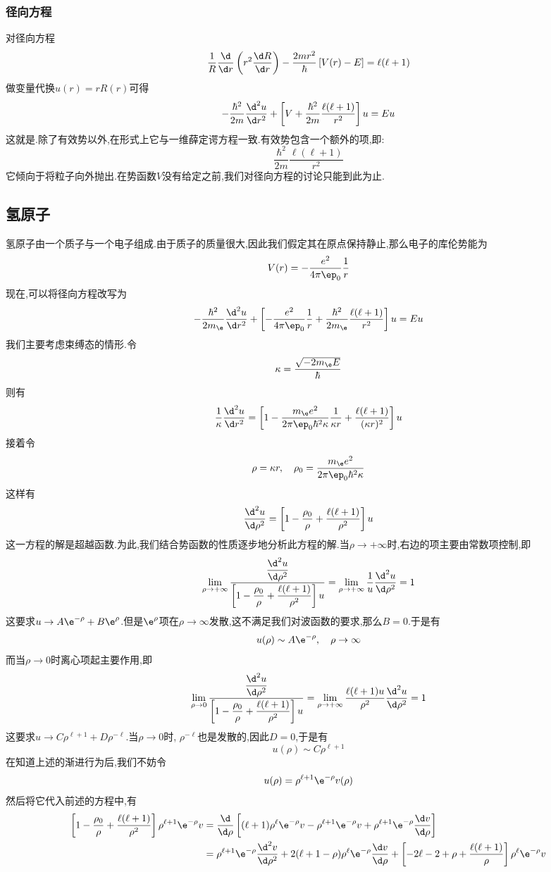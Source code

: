 \documentclass{ctexart}
\begin{document}
\subsubsection{径向方程}
对径向方程
\[\dfrac{1}{R}\dfrac{\d}{\d r}\left(r^2\dfrac{\d R}{\d r}\right)-\dfrac{2mr^2}{\hbar}\left[V(r)-E\right]=\ell(\ell+1)\]
做变量代换$u(r)=rR(r)$可得
\[-\dfrac{\hbar^2}{2m}\dfrac{\d^2 u}{\d r^2}+\left[V+\dfrac{\hbar^2}{2m}\dfrac{\ell(\ell+1)}{r^2}\right]u=Eu\]
这就是.除了有效势以外,在形式上它与一维薛定谔方程一致.有效势包含一个额外的项,即:
\[\dfrac{\hbar^2}{2m}\dfrac{\ell(\ell+1)}{r^2}\]
它倾向于将粒子向外抛出.在势函数$V$没有给定之前,我们对径向方程的讨论只能到此为止.
\subsection{氢原子}
氢原子由一个质子与一个电子组成.由于质子的质量很大,因此我们假定其在原点保持静止,那么电子的库伦势能为
\[V(r)=-\dfrac{e^2}{4\pi\ep_0}\dfrac{1}{r}\]
现在,可以将径向方程改写为
\[-\dfrac{\hbar^2}{2m_\e}\dfrac{\d^2u}{\d r^2}+\left[-\dfrac{e^2}{4\pi\ep_0}\dfrac1r+\dfrac{\hbar^2}{2m_\e}\dfrac{\ell(\ell+1)}{r^2}\right]u=Eu\]
\indent 我们主要考虑束缚态的情形.令
\[\kappa=\dfrac{\sqrt{-2m_\e E}}{\hbar}\]
则有
\[\dfrac{1}{\kappa}\dfrac{\d^2u}{\d r^2}=\left[1-\dfrac{m_\e e^2}{2\pi\ep_0\hbar^2\kappa}\dfrac{1}{\kappa r}+\dfrac{\ell(\ell+1)}{(\kappa r)^2}\right]u\]
接着令
\[\rho=\kappa r,\quad\rho_0=\dfrac{m_\e e^2}{2\pi\ep_0\hbar^2\kappa}\]
这样有
\[\dfrac{\d^2u}{\d\rho^2}=\left[1-\dfrac{\rho_0}{\rho}+\dfrac{\ell(\ell+1)}{\rho^2}\right]u\]
\indent 这一方程的解是超越函数.为此,我们结合势函数的性质逐步地分析此方程的解.当$\rho\to+\infty$时,右边的项主要由常数项控制,即
\[\lim_{\rho\to+\infty}\dfrac{\dfrac{\d^2u}{\d\rho^2}}{\left[1-\dfrac{\rho_0}{\rho}+\dfrac{\ell(\ell+1)}{\rho^2}\right]u}=\lim_{\rho\to+\infty}\dfrac{1}{u}\dfrac{\d^2u}{\d\rho^2}=1\]
这要求$u\to A\e^{-\rho}+B\e^{\rho}$.但是$\e^{\rho}$项在$\rho\to\infty$发散,这不满足我们对波函数的要求,那么$B=0$.于是有
\[u(\rho)\sim A\e^{-\rho},\quad\rho\to\infty\]
而当$\rho\to0$时离心项起主要作用,即
\[\lim_{\rho\to0}\dfrac{\dfrac{\d^2u}{\d\rho^2}}{\left[1-\dfrac{\rho_0}{\rho}+\dfrac{\ell(\ell+1)}{\rho^2}\right]u}=\lim_{\rho\to+\infty}\dfrac{\ell(\ell+1)u}{\rho^2}\dfrac{\d^2 u}{\d\rho^2}=1\]
这要求$u\to C\rho^{\ell+1}+D\rho^{-\ell}$.当$\rho\to0$时, $\rho^{-\ell}$也是发散的,因此$D=0$,于是有
\[u(\rho)\sim C\rho^{\ell+1}\]
\indent 在知道上述的渐进行为后,我们不妨令
\[u(\rho)=\rho^{\ell+1}\e^{-\rho}v(\rho)\]
然后将它代入前述的方程中,有
\[\begin{aligned}
    \left[1-\dfrac{\rho_0}{\rho}+\dfrac{\ell(\ell+1)}{\rho^2}\right]\rho^{\ell+1}\e^{-\rho}v
    &=\dfrac{\d}{\d\rho}\left[(\ell+1)\rho^{\ell}\e^{-\rho}v-\rho^{\ell+1}\e^{-\rho}v+\rho^{\ell+1}\e^{-\rho}\dfrac{\d v}{\d\rho}\right]\\
    &=\rho^{\ell+1}\e^{-\rho}\dfrac{\d^2v}{\d\rho^2}+2(\ell+1-\rho)\rho^{\ell}\e^{-\rho}\dfrac{\d v}{\d\rho}+\left[-2\ell-2+\rho+\dfrac{\ell(\ell+1)}{\rho}\right]\rho^{\ell}\e^{-\rho}v
\end{aligned}\]
\end{document}

